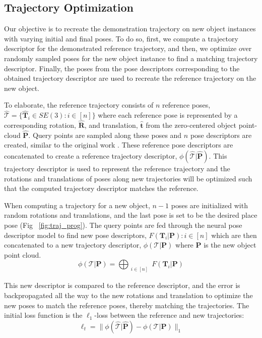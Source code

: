 \documentclass[10pt,twocolumn,letterpaper]{article}
\begin{document}
\subsection{Trajectory Optimization}

Our objective is to recreate the demonstration trajectory on new object instances with varying initial and final poses. To do so, first, we compute a trajectory descriptor for the demonstrated reference trajectory, and then, we optimize over randomly sampled poses for the new object instance to find a matching trajectory descriptor. Finally, the poses from the pose descriptors corresponding to the obtained trajectory descriptor are used to recreate the reference trajectory on the new object.

To elaborate, the reference trajectory consists of $n$ reference poses, $\hat{\mathcal{T}} = \{\hat{\mathbf{T}}_i \in SE(3) : i \in [n]\}$ where each reference pose is represented by a corresponding rotation, $\hat{\mathbf{R}}$, and translation, $\hat{\mathbf{t}}$ from the zero-centered object point-cloud $\hat{\mathbf{P}}$. Query points are sampled along these poses and $n$ pose descriptors are created, similar to the original work \cite{simeonovdu2021ndf}. These reference pose descriptors are concatenated to create a reference trajectory descriptor, $\phi(\hat{\mathcal{T}}|\hat{\mathbf{P}})$. This trajectory descriptor is used to represent the reference trajectory and the rotations and translations of poses along new trajectories will be optimized such that the computed trajectory descriptor matches the reference.

When computing a trajectory for a new object, $n-1$ poses are initialized with random rotations and translations, and the last pose is set to be the desired place pose (Fig ~\ref{fig:traj_prog}). The query points are fed through the neural pose descriptor model to find new pose descriptors, $F(\mathbf{T}_i|\mathbf{P}): i \in [n]$ which are then concatenated to a new trajectory descriptor, $\phi(\mathcal{T}|\mathbf{P})$ where $\mathbf{P}$ is the new object point cloud. 
\begin{equation}
\phi(\mathcal{T}|\mathbf{P}) = \bigoplus_{\substack{i \in [n]}} F(\mathbf{T}_i|\mathbf{P})
\end{equation}

This new descriptor is compared to the reference descriptor, and the error is backpropagated all the way to the new rotations and translation to optimize the new poses to match the reference poses, thereby matching the trajectories. The initial loss function is the $\ell_1$-loss between the reference and new trajectories:
\begin{equation}
\ell_t = \|\phi(\hat{\mathcal{T}}|\hat{\mathbf{P}}) - \phi(\mathcal{T}|\mathbf{P})\|_1
\end{equation}
\end{document}
